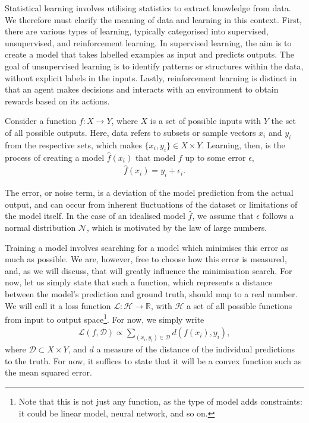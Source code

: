 Statistical learning involves utilising statistics to extract knowledge from data. We therefore must clarify the meaning of data and learning in this context. First, there are various types of learning, typically categorised into supervised, unsupervised, and reinforcement learning. In supervised learning, the aim is to create a model that takes labelled examples as input and predicts outputs. The goal of unsupervised learning is to identify patterns or structures within the data, without explicit labels in the inputs. Lastly, reinforcement learning is distinct in that an agent makes decisions and interacts with an environment to obtain rewards based on its actions.

Consider a function $f :  X \to Y$, where $X$ is a set of possible inputs with $Y$ the set of all possible outputs. Here, data refers to subsets or sample vectors $x_i$ and $y_i$ from the respective sets, which makes $\{x_i, y_i\} \in X \times Y$. Learning, then, is the process of creating a model $\hat{f}(x_i)$ that model $f$ up to some error $\epsilon$,
\begin{align*}
    \hat{f}(x_i) = y_i + \epsilon_i.
\end{align*}

The error, or noise term, is a deviation of the model prediction from the actual output, and can occur from inherent fluctuations of the dataset or limitations of the model itself. In the case of an idealised model $\hat{f}$, we assume that $\epsilon$ follows a normal distribution $\mathcal{N}$, which is motivated by the law of large numbers.

Training a model involves searching for a model which minimises this error as much as possible. We are, however, free to choose how this error is measured, and, as we will discuss, that will greatly influence the minimisation search. For now, let us simply state that such a function, which represents a distance between the model's prediction and ground truth, should map to a real number. We will call it a loss function $\mathcal{L : \mathcal{H}} \to \mathbb{R}$, with $\mathcal{H}$ a set of all possible functions from input to output space\footnote{Note that this is not just any function, as the type of model adds constraints: it could be linear model, neural network, and so on.}. For now, we simply write
\begin{align}
    \mathcal{L}(f, \mathcal{D}) \propto \sum_{(x_i, y_i)\in \mathcal{D}}d(f(x_i), y_i),
    \label{eq:loss_as_average}
\end{align}
where $\mathcal{D} \subset X\times Y$, and $d$ a measure of the distance of the individual predictions to the truth. For now, it suffices to state that it will be a convex function such as the mean squared error.

